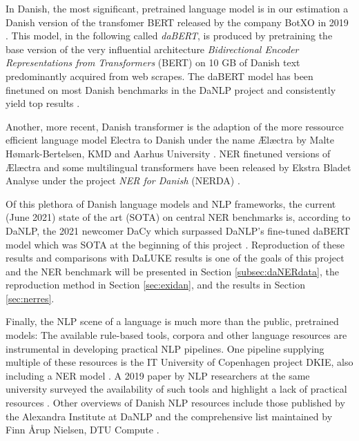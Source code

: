 \documentclass[main.tex]{subfiles}
\begin{document}
In Danish, the most significant, pretrained language model is in our estimation a Danish version of the transfomer BERT released by the company BotXO in 2019 \cite{botxo2019dabert} .
This model, in the following called \emph{daBERT}, is produced by pretraining the base version of the very influential architecture \emph{Bidirectional Encoder Representations from Transformers} (BERT) \cite{devlin2019bert} on 10 GB of Danish text predominantly acquired from web scrapes.
The daBERT model has been finetuned on most Danish benchmarks in the DaNLP project and consistently yield top results \cite{danlp2021, hvingelby2020dane}.

Another, more recent, Danish transformer is the adaption of the more ressource efficient language model Electra to Danish under the name Ælæctra by Malte Hømark-Bertelsen, KMD and Aarhus University \cite{bertelsen2020lctra}.
NER finetuned versions of Ælæctra and some multilingual transformers have been released by Ekstra Bladet Analyse under the project \emph{NER for Danish} (NERDA) \cite{kjeldgaard2020nerda}.

Of this plethora of Danish language models and NLP frameworks, the current (June 2021) state of the art (SOTA) on central NER benchmarks is, according to DaNLP, the 2021 newcomer DaCy which surpassed DaNLP's fine-tuned daBERT model which was SOTA at the beginning of this project \footnotemark.
Reproduction of these results and comparisons with DaLUKE results is one of the goals of this project and the NER benchmark will be presented in Section \ref{subsec:daNERdata}, the reproduction method in Section \ref{sec:exidan}, and the results in Section \ref{sec:nerres}.

Finally, the NLP scene of a language is much more than the public, pretrained models:
The available rule-based tools, corpora and other language resources are instrumental in developing practical NLP pipelines.
One pipeline supplying multiple of these resources is the IT University of Copenhagen project DKIE, also including a NER model \cite{derc2014dkie}.
A 2019 paper by NLP researchers at the same university surveyed the availability of such tools and highlight a lack of practical resources \cite{kirkedal2019lacunae}.
Other overviews of Danish NLP resources include those published by the Alexandra Institute at DaNLP \cite{danlp2021} and the comprehensive list maintained by Finn Årup Nielsen, DTU Compute \cite{arup21awesome}.
\end{document}
